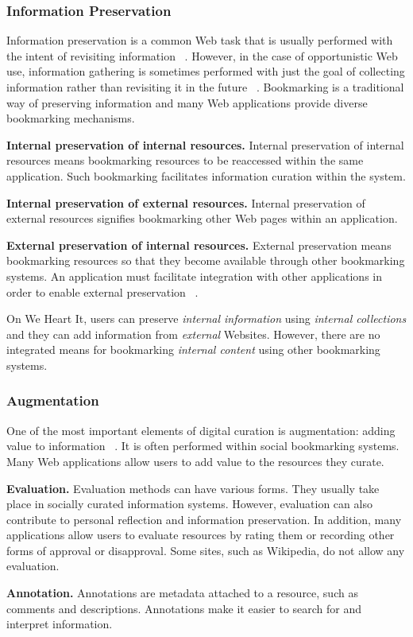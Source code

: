 {\subsubsection{Information Preservation}
Information preservation is a common Web task that is usually performed with the intent of revisiting information ~\cite{abrams, wittaker}. However, in the case of opportunistic Web use, information gathering is sometimes performed with just the goal of collecting information rather than revisiting it in the future ~\cite{lindley}. Bookmarking is a traditional way of preserving information and many Web applications provide diverse bookmarking mechanisms. 

\textbf{Internal preservation of internal resources.} Internal preservation of internal resources means bookmarking resources to be reaccessed within the same application. Such bookmarking facilitates information curation within the system.

\textbf{Internal preservation of external resources.} Internal preservation of external resources signifies bookmarking other Web pages within an application. 
  
\textbf{External preservation of internal resources.} External preservation means bookmarking resources so that they become available through other bookmarking systems. An application must facilitate integration with other applications in order to enable external preservation ~\cite{abrams}.

On We Heart It, users can preserve \textit{internal  information} using \textit{internal collections} and they can add information from \textit{external} Websites. However, there are no integrated means for bookmarking \textit{internal content} using other bookmarking systems.  

} %

{\subsubsection{Augmentation}
One of the most important elements of digital curation is augmentation: adding value to information ~\cite{beagrie, wittaker}. It is often performed within social bookmarking systems. Many Web applications allow users to add value to the resources they curate. 

\textbf{Evaluation.} Evaluation methods can have various forms. They usually take place in socially curated information systems. However, evaluation can also contribute to personal reflection and information preservation. In addition, many applications allow users to evaluate resources by rating them or recording other forms of approval or disapproval. Some sites, such as Wikipedia, do not allow any evaluation. 

\textbf{Annotation.} Annotations are metadata attached to a resource, such as comments and descriptions. Annotations make it easier to search for and interpret information. 
} %

